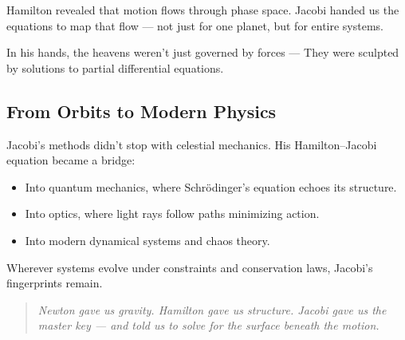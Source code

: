 \begin{tcolorbox}[colback=blue!5!white, colframe=blue!50!black, title={Jacobi’s Legacy: When PDEs Charted the Cosmos}]
Hamilton revealed that motion flows through phase space.  
Jacobi handed us the equations to map that flow — not just for one planet, but for entire systems.

In his hands, the heavens weren’t just governed by forces —  
They were sculpted by solutions to partial differential equations.
\end{tcolorbox}

\subsection*{From Orbits to Modern Physics}

Jacobi’s methods didn’t stop with celestial mechanics. His Hamilton–Jacobi equation became a bridge:

\begin{itemize}
  \item Into quantum mechanics, where Schrödinger’s equation echoes its structure.
  \item Into optics, where light rays follow paths minimizing action.
  \item Into modern dynamical systems and chaos theory.
\end{itemize}

Wherever systems evolve under constraints and conservation laws, Jacobi’s fingerprints remain.

\begin{quote}
\textit{Newton gave us gravity.  
Hamilton gave us structure.  
Jacobi gave us the master key — and told us to solve for the surface beneath the motion.}
\end{quote}


